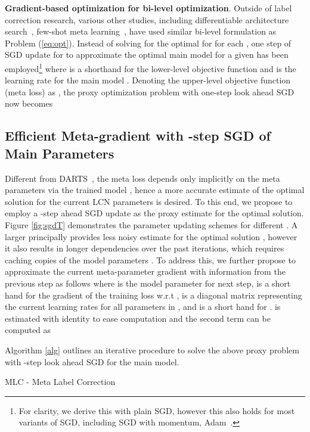\textbf{Gradient-based optimization for bi-level
  optimization}. Outside of label correction research, various other
studies, including differentiable architecture
search~\cite{liu2018darts}, few-shot meta
learning~\cite{finn2017model,nichol2018first}, have used similar bi-level formulation
as Problem (\ref{eq:opt}). Instead of solving for the optimal for
 for each , one step of SGD update for  to approximate the optimal main model for a given 
has been employed\footnote{For clarity, we derive this with plain SGD,
  however this also holds for most variants of SGD, including SGD with
  momentum, Adam~\cite{kingma2014adam}.}
 where  is a shorthand for the
lower-level objective function and  is the learning rate for the
main model . Denoting the upper-level objective function (meta loss) as
 , the proxy optimization
problem with one-step look ahead SGD now becomes



\subsection{Efficient Meta-gradient with -step SGD of Main Parameters}

Different from DARTS~\cite{liu2018darts}, the meta loss
 depends only implicitly on the meta parameters  via the trained model , hence a more
accurate estimate of the optimal solution 
for the current LCN parameters  is desired. To this end, we propose
to employ a -step ahead SGD update as the proxy estimate for the
optimal solution. Figure \ref{fig:sgdT} demonstrates the parameter
updating schemes for different . A larger  principally provides
less noisy estimate for the optimal solution , however it also results in longer dependencies
over the past  iterations, which requires caching  copies of the
model parameters . To address this, we further propose to approximate the
current meta-parameter gradient with information from the previous 
step as follows
where  is the model parameter for next step, 
is a short hand for the gradient of the training loss w.r.t ,
 is a diagonal matrix representing the current learning rates
for all parameters in , and  is a
short hand for .  is
estimated with identity to ease computation and the second term can be
computed as


Algorithm \ref{alg} outlines an iterative procedure to solve the above
proxy problem with -step look ahead SGD for the main model.

\begin{algorithm}[t]
 \caption{MLC - Meta Label Correction}
 \label{alg}
\end{algorithm}



